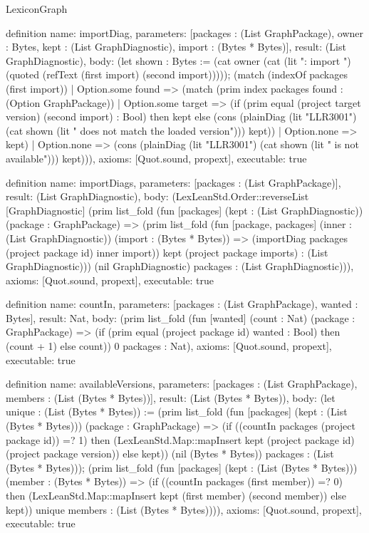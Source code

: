 \begin{lexlean}{LexiconGraph}
\begin{semanticmodule}
definition{
  name: importDiag,
  parameters: [packages : (List GraphPackage), owner : Bytes, kept : (List GraphDiagnostic), import : (Bytes * Bytes)],
  result: (List GraphDiagnostic),
  body: (let shown : Bytes := (cat owner (cat (lit ": import ") (quoted (refText (first import) (second import))))); (match (indexOf packages (first import))
    | Option.some found => (match (prim index packages found : (Option GraphPackage))
      | Option.some target => (if (prim equal (project target version) (second import) : Bool) then kept else (cons (plainDiag (lit "LLR3001") (cat shown (lit " does not match the loaded version"))) kept))
      | Option.none => kept)
    | Option.none => (cons (plainDiag (lit "LLR3001") (cat shown (lit " is not available"))) kept))),
  axioms: [Quot.sound, propext],
  executable: true
}

definition{
  name: importDiags,
  parameters: [packages : (List GraphPackage)],
  result: (List GraphDiagnostic),
  body: (LexLeanStd.Order::reverseList [GraphDiagnostic] (prim list_fold (fun [packages] (kept : (List GraphDiagnostic)) (package : GraphPackage) => (prim list_fold (fun [package, packages] (inner : (List GraphDiagnostic)) (import : (Bytes * Bytes)) => (importDiag packages (project package id) inner import)) kept (project package imports) : (List GraphDiagnostic))) (nil GraphDiagnostic) packages : (List GraphDiagnostic))),
  axioms: [Quot.sound, propext],
  executable: true
}

definition{
  name: countIn,
  parameters: [packages : (List GraphPackage), wanted : Bytes],
  result: Nat,
  body: (prim list_fold (fun [wanted] (count : Nat) (package : GraphPackage) => (if (prim equal (project package id) wanted : Bool) then (count + 1) else count)) 0 packages : Nat),
  axioms: [Quot.sound, propext],
  executable: true
}

definition{
  name: availableVersions,
  parameters: [packages : (List GraphPackage), members : (List (Bytes * Bytes))],
  result: (List (Bytes * Bytes)),
  body: (let unique : (List (Bytes * Bytes)) := (prim list_fold (fun [packages] (kept : (List (Bytes * Bytes))) (package : GraphPackage) => (if ((countIn packages (project package id)) =? 1) then (LexLeanStd.Map::mapInsert kept (project package id) (project package version)) else kept)) (nil (Bytes * Bytes)) packages : (List (Bytes * Bytes))); (prim list_fold (fun [packages] (kept : (List (Bytes * Bytes))) (member : (Bytes * Bytes)) => (if ((countIn packages (first member)) =? 0) then (LexLeanStd.Map::mapInsert kept (first member) (second member)) else kept)) unique members : (List (Bytes * Bytes)))),
  axioms: [Quot.sound, propext],
  executable: true
}


\end{semanticmodule}
\end{lexlean}
